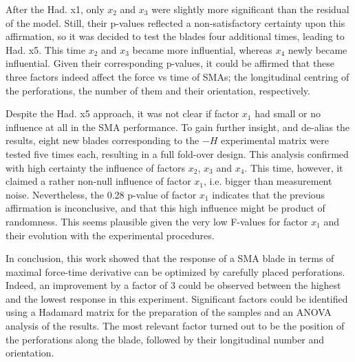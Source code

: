 After the Had. x1, only $x_2$ and $x_3$ were slightly more significant than the residual of the model. Still, their p-values reflected a non-satisfactory certainty upon this affirmation, so it was decided to test the blades four additional times, leading to Had. x5. This time $x_2$ and $x_3$ became more influential, whereas $x_4$ newly became influential. Given their corresponding p-values, it could be affirmed that these three factors indeed affect the force vs time of SMAs; the longitudinal centring of the perforations, the number of them and their orientation, respectively.

Despite the Had. x5 approach, it was not clear if factor $x_1$ had small or no influence at all in the SMA performance. To gain further insight, and de-alias the results, eight new blades corresponding to the $-H$ experimental matrix were tested five times each, resulting in a full fold-over design. This analysis confirmed with high certainty the influence of factors $x_2$, $x_3$ and $x_4$. This time, however, it claimed a rather non-null influence of factor $x_1$, i.e. bigger than measurement noise. Nevertheless, the 0.28 p-value of factor $x_1$ indicates that the previous affirmation is inconclusive, and that this high influence might be product of randomness. This seems plausible given the very low F-values for factor $x_1$ and their evolution with the experimental procedures.

In conclusion, this work showed that the response of a SMA blade in terms of maximal force-time derivative can be optimized by carefully placed perforations. Indeed, an improvement by a factor of 3 could be observed between the highest and the lowest response in this experiment. Significant factors could be identified using a Hadamard matrix for the preparation of the samples and an ANOVA analysis of the results. The most relevant factor turned out to be the position of the perforations along the blade, followed by their longitudinal number and orientation.
